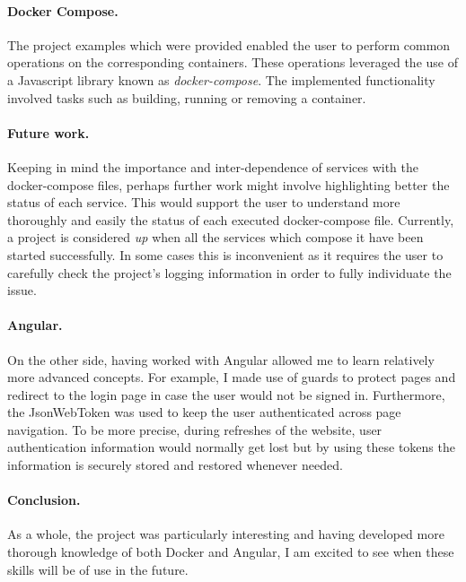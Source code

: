 \documentclass[multi, tikz, a4paper, oneside]{article}
\begin{document}
\paragraph{Docker Compose.}
The project examples which were provided enabled the user to perform common
operations on the corresponding containers. These operations leveraged the use
of a Javascript library known as {\em{docker-compose}}. The implemented
functionality involved tasks such as building, running or removing a container.

\paragraph{Future work.}
Keeping in mind the importance and inter-dependence of services with the
docker-compose files, perhaps further work might involve highlighting better the
status of each service. This would support the user to understand more
thoroughly and easily the status of each executed docker-compose file.
Currently, a project is considered {\em{up}} when all the services which compose
it have been started successfully. In some cases this is inconvenient as it
requires the user to carefully check the project's logging information in order
to fully individuate the issue.

\paragraph{Angular.}
On the other side, having worked with Angular allowed me to learn relatively
more advanced concepts. For example, I made use of guards to protect pages and
redirect to the login page in case the user would not be signed in. Furthermore,
the JsonWebToken was used to keep the user authenticated across page navigation.
To be more precise, during refreshes of the website, user authentication
information would normally get lost but by using these tokens the information is
securely stored and restored whenever needed.

\paragraph{Conclusion.}
As a whole, the project was particularly interesting and having developed more
thorough knowledge of both Docker and Angular, I am excited to see when these
skills will be of use in the future.



\newpage
\printbibliography
\end{document}
